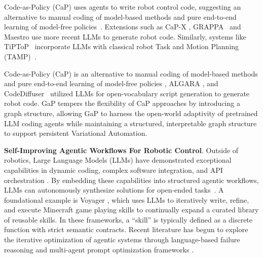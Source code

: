 Code-as-Policy (CaP) uses agents to write robot control code, suggesting an alternative to manual coding of model-based methods and pure end-to-end learning of model-free policies~\cite{codeaspolicies2022}. 
Extensions such as CaP-X \cite{fu2026cap}, GRAPPA~\cite{bucker2026grappa} and Maestro \cite{shi2025maestro} use more recent LLMs to generate robot code. Similarly, systems like TiPToP~\cite{shen2026tiptop} incorporate LLMs with classical robot Task and Motion Planning (TAMP)~\cite{wang2024llm, curtis2025trust, yang2025guiding, kumar2026open}. 



Code-as-Policy (CaP)
is an alternative to manual coding of model-based methods and pure end-to-end learning of model-free policies \cite{codeaspolicies2022}, ALGARA \cite{coteagentic}, and CodeDiffuser~\cite{yin2025codediffuser} utilized LLMs for open-vocabulary script generation to generate robot code.
GaP tempers the flexibility of CaP approaches by introducing a graph structure, allowing GaP to harness the open-world adaptivity of pretrained LLM coding agents while maintaining a structured, interpretable graph structure to support persistent Variational Automation.  

\textbf{Self-Improving Agentic Workflows For Robotic Control}.
Outside of robotics, Large Language Models (LLMs) have demonstrated exceptional capabilities in dynamic coding, complex software integration, and API orchestration \cite{wu2024introducing, team2026qwen3, hou2025model, openai2024gpt4o, anthropic2024claude35, google2025gemini25}. By embedding these capabilities into structured agentic workflows, LLMs can autonomously synthesize solutions for open-ended tasks~\cite{zhang2025aflow}. A foundational example is Voyager \cite{wang2023voyager}, which uses LLMs to iteratively write, refine, and execute Minecraft game playing skills to continually expand a curated library of reusable skills. In these frameworks, a ``skill'' is typically defined as a discrete function with strict semantic contracts. Recent literature has begun to explore the iterative optimization of agentic systems through language-based failure reasoning \cite{zehle2026promptolution} and multi-agent prompt optimization frameworks \cite{agrawal2025gepa, lee2025feedback}.


